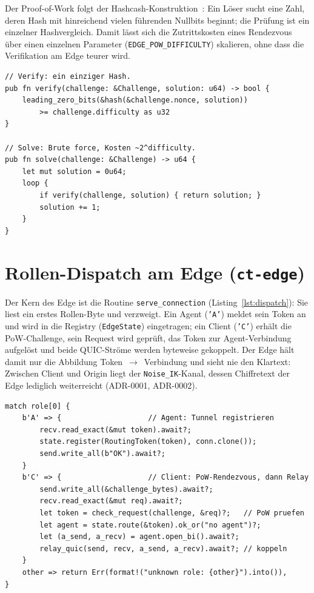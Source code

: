 Der Proof-of-Work folgt der Hashcash-Konstruktion~\cite{back2002hashcash}: Ein
Löser sucht eine Zahl, deren Hash mit hinreichend vielen führenden Nullbits
beginnt; die Prüfung ist ein einzelner Hashvergleich. Damit lässt sich die
Zutrittskosten eines Rendezvous über einen einzelnen Parameter
(\texttt{EDGE\_POW\_DIFFICULTY}) skalieren, ohne dass die Verifikation am Edge
teurer wird.

\begin{lstlisting}[caption={Asymmetrischer Proof-of-Work: Prüfen ist billig, Lösen teuer (\texttt{ct-common::pow}).},label={lst:pow}]
// Verify: ein einziger Hash.
pub fn verify(challenge: &Challenge, solution: u64) -> bool {
    leading_zero_bits(&hash(&challenge.nonce, solution))
        >= challenge.difficulty as u32
}

// Solve: Brute force, Kosten ~2^difficulty.
pub fn solve(challenge: &Challenge) -> u64 {
    let mut solution = 0u64;
    loop {
        if verify(challenge, solution) { return solution; }
        solution += 1;
    }
}
\end{lstlisting}

\section{Rollen-Dispatch am Edge (\texttt{ct-edge})}
\label{sec:impl-dispatch}

Der Kern des Edge ist die Routine \texttt{serve\_connection}
(Listing~\ref{lst:dispatch}): Sie liest ein erstes Rollen-Byte und verzweigt.
Ein Agent (\texttt{'A'}) meldet sein Token an und wird in die Registry
(\texttt{EdgeState}) eingetragen; ein Client (\texttt{'C'}) erhält die
PoW-Challenge, sein Request wird geprüft, das Token zur Agent-Verbindung
aufgelöst und beide QUIC-Ströme werden byteweise gekoppelt. Der Edge hält damit
nur die Abbildung Token~$\rightarrow$~Verbindung und sieht nie den Klartext:
Zwischen Client und Origin liegt der \texttt{Noise\_IK}-Kanal, dessen
Chiffretext der Edge lediglich weiterreicht (ADR-0001, ADR-0002).

\begin{lstlisting}[caption={Rollen-Dispatch am Edge (gekürzt, \texttt{ct-edge::serve}).},label={lst:dispatch}]
match role[0] {
    b'A' => {                    // Agent: Tunnel registrieren
        recv.read_exact(&mut token).await?;
        state.register(RoutingToken(token), conn.clone());
        send.write_all(b"OK").await?;
    }
    b'C' => {                    // Client: PoW-Rendezvous, dann Relay
        send.write_all(&challenge_bytes).await?;
        recv.read_exact(&mut req).await?;
        let token = check_request(challenge, &req)?;   // PoW pruefen
        let agent = state.route(&token).ok_or("no agent")?;
        let (a_send, a_recv) = agent.open_bi().await?;
        relay_quic(send, recv, a_send, a_recv).await?; // koppeln
    }
    other => return Err(format!("unknown role: {other}").into()),
}
\end{lstlisting}

